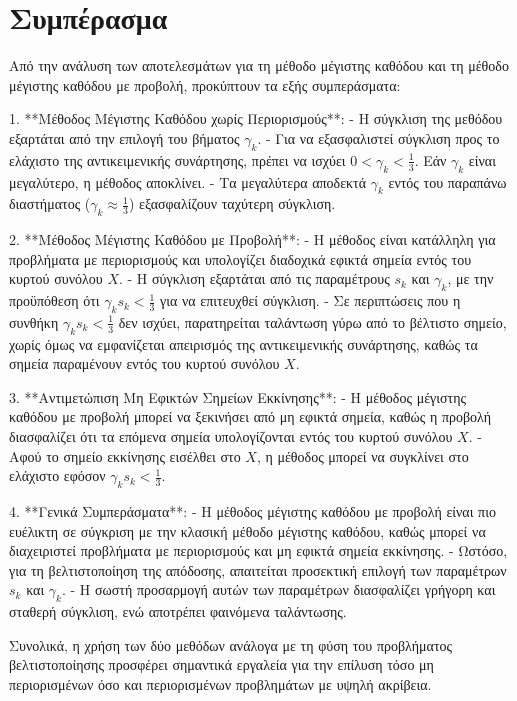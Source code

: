 \documentclass[a4paper,12pt]{article}
\begin{document}
\newpage

\section*{Συμπέρασμα}

Από την ανάλυση των αποτελεσμάτων για τη μέθοδο μέγιστης καθόδου και τη μέθοδο μέγιστης καθόδου με προβολή, 
προκύπτουν τα εξής συμπεράσματα:

1. **Μέθοδος Μέγιστης Καθόδου χωρίς Περιορισμούς**:
   - Η σύγκλιση της μεθόδου εξαρτάται από την επιλογή του βήματος $\gamma_k$.
   - Για να εξασφαλιστεί σύγκλιση προς το ελάχιστο της αντικειμενικής συνάρτησης, πρέπει να ισχύει 
     $0 < \gamma_k < \frac{1}{3}$. Εάν $\gamma_k$ είναι μεγαλύτερο, η μέθοδος αποκλίνει.
   - Τα μεγαλύτερα αποδεκτά $\gamma_k$ εντός του παραπάνω διαστήματος ($\gamma_k \approx \frac{1}{3}$) 
     εξασφαλίζουν ταχύτερη σύγκλιση.

2. **Μέθοδος Μέγιστης Καθόδου με Προβολή**:
   - Η μέθοδος είναι κατάλληλη για προβλήματα με περιορισμούς και υπολογίζει διαδοχικά εφικτά σημεία εντός του 
     κυρτού συνόλου $X$.
   - Η σύγκλιση εξαρτάται από τις παραμέτρους $s_k$ και $\gamma_k$, με την προϋπόθεση ότι $\gamma_k s_k < \frac{1}{3}$ 
     για να επιτευχθεί σύγκλιση.
   - Σε περιπτώσεις που η συνθήκη $\gamma_k s_k < \frac{1}{3}$ δεν ισχύει, παρατηρείται ταλάντωση γύρω από το βέλτιστο σημείο, 
     χωρίς όμως να εμφανίζεται απειρισμός της αντικειμενικής συνάρτησης, καθώς τα σημεία παραμένουν εντός του κυρτού συνόλου $X$.

3. **Αντιμετώπιση Μη Εφικτών Σημείων Εκκίνησης**:
   - Η μέθοδος μέγιστης καθόδου με προβολή μπορεί να ξεκινήσει από μη εφικτά σημεία, καθώς η προβολή διασφαλίζει ότι 
     τα επόμενα σημεία υπολογίζονται εντός του κυρτού συνόλου $X$.
   - Αφού το σημείο εκκίνησης εισέλθει στο $X$, η μέθοδος μπορεί να συγκλίνει στο ελάχιστο εφόσον $\gamma_k s_k < \frac{1}{3}$.

4. **Γενικά Συμπεράσματα**:
   - Η μέθοδος μέγιστης καθόδου με προβολή είναι πιο ευέλικτη σε σύγκριση με την κλασική μέθοδο μέγιστης καθόδου, 
     καθώς μπορεί να διαχειριστεί προβλήματα με περιορισμούς και μη εφικτά σημεία εκκίνησης.
   - Ωστόσο, για τη βελτιστοποίηση της απόδοσης, απαιτείται προσεκτική επιλογή των παραμέτρων $s_k$ και $\gamma_k$.
   - Η σωστή προσαρμογή αυτών των παραμέτρων διασφαλίζει γρήγορη και σταθερή σύγκλιση, ενώ αποτρέπει φαινόμενα ταλάντωσης.

Συνολικά, η χρήση των δύο μεθόδων ανάλογα με τη φύση του προβλήματος βελτιστοποίησης προσφέρει σημαντικά εργαλεία 
για την επίλυση τόσο μη περιορισμένων όσο και περιορισμένων προβλημάτων με υψηλή ακρίβεια.
\end{document}
